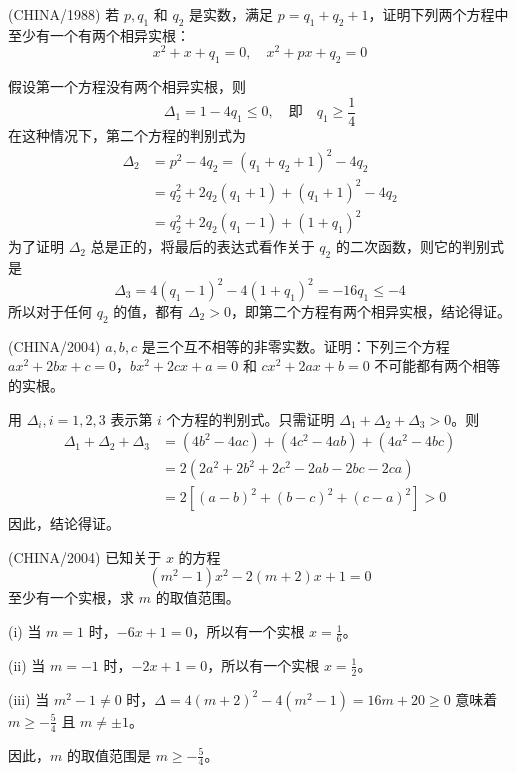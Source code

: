 \begin{questions}
\question (CHINA/1988) 若 $p, q_1$ 和 $q_2$ 是实数，满足 $p = q_1 + q_2 + 1$，证明下列两个方程中至少有一个有两个相异实根：
\[
x^2 + x + q_1 = 0, \quad x^2 + px + q_2 = 0
\]

\begin{solution}
假设第一个方程没有两个相异实根，则
\[
\Delta_1 = 1 - 4q_1 \le 0, \quad \text{即} \quad q_1 \ge \frac{1}{4}
\]
在这种情况下，第二个方程的判别式为
\begin{align*}
\Delta_2 &= p^2 - 4q_2 = (q_1 + q_2 + 1)^2 - 4q_2 \\
&= q_2^2 + 2q_2(q_1 + 1) + (q_1 + 1)^2 - 4q_2 \\
&= q_2^2 + 2q_2(q_1 - 1) + (1 + q_1)^2
\end{align*}
为了证明 $\Delta_2$ 总是正的，将最后的表达式看作关于 $q_2$ 的二次函数，则它的判别式是
\[
\Delta_3 = 4(q_1 - 1)^2 - 4(1 + q_1)^2 = -16q_1 \le -4
\]
所以对于任何 $q_2$ 的值，都有 $\Delta_2 > 0$，即第二个方程有两个相异实根，结论得证。
\end{solution}

\question (CHINA/2004) $a, b, c$ 是三个互不相等的非零实数。证明：下列三个方程 $ax^2 + 2bx + c = 0$，$bx^2 + 2cx + a = 0$ 和 $cx^2 + 2ax + b = 0$ 不可能都有两个相等的实根。

\begin{solution}
用 $\Delta_i, i = 1, 2, 3$ 表示第 $i$ 个方程的判别式。只需证明 $\Delta_1 + \Delta_2 + \Delta_3 > 0$。则
\begin{align*}
\Delta_1 + \Delta_2 + \Delta_3 &= (4b^2 - 4ac) + (4c^2 - 4ab) + (4a^2 - 4bc) \\
&= 2(2a^2 + 2b^2 + 2c^2 - 2ab - 2bc - 2ca) \\
&= 2\left[ (a - b)^2 + (b - c)^2 + (c - a)^2 \right] > 0
\end{align*}
因此，结论得证。
\end{solution}

\question (CHINA/2004) 已知关于 $x$ 的方程
\[
(m^2 - 1)x^2 - 2(m + 2)x + 1 = 0
\]
至少有一个实根，求 $m$ 的取值范围。

\begin{solution}
(i) 当 $m = 1$ 时，$-6x + 1 = 0$，所以有一个实根 $x = \frac{1}{6}$。

(ii) 当 $m = -1$ 时，$-2x + 1 = 0$，所以有一个实根 $x = \frac{1}{2}$。

(iii) 当 $m^2 - 1 \neq 0$ 时，$\Delta = 4(m + 2)^2 - 4(m^2 - 1) = 16m + 20 \ge 0$ 意味着 $m \ge -\frac{5}{4}$ 且 $m \neq \pm 1$。

因此，$m$ 的取值范围是 $m \ge -\frac{5}{4}$。
\end{solution}


\end{questions}
